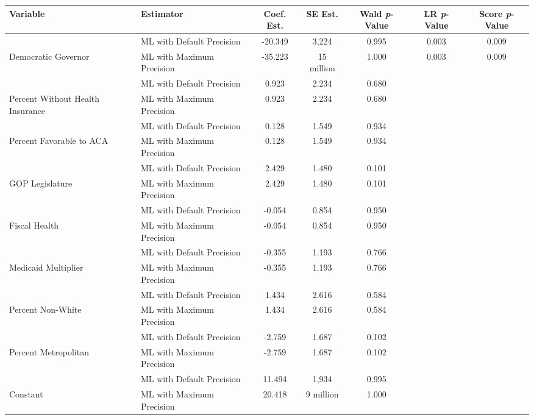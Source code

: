 
\begin{tabular}{llccccc}
\toprule
Variable & Estimator & Coef. Est. & SE Est. & Wald \textit{p}-Value & LR \textit{p}-Value & Score \textit{p}-Value\\
\midrule
 & ML with Default Precision & -20.349 & 3,224 & 0.995 & 0.003 & 0.009\\

\multirow{-2}{*}{\raggedright\arraybackslash Democratic Governor} & ML with Maximum Precision & -35.223 & 15 million & 1.000 & 0.003 & 0.009\\
\cmidrule{1-7}
 & ML with Default Precision & 0.923 & 2.234 & 0.680 &  & \\

\multirow{-2}{*}{\raggedright\arraybackslash Percent Without Health Insurance} & ML with Maximum Precision & 0.923 & 2.234 & 0.680 &  & \\
\cmidrule{1-7}
 & ML with Default Precision & 0.128 & 1.549 & 0.934 &  & \\

\multirow{-2}{*}{\raggedright\arraybackslash Percent Favorable to ACA} & ML with Maximum Precision & 0.128 & 1.549 & 0.934 &  & \\
\cmidrule{1-7}
 & ML with Default Precision & 2.429 & 1.480 & 0.101 &  & \\

\multirow{-2}{*}{\raggedright\arraybackslash GOP Legislature} & ML with Maximum Precision & 2.429 & 1.480 & 0.101 &  & \\
\cmidrule{1-7}
 & ML with Default Precision & -0.054 & 0.854 & 0.950 &  & \\

\multirow{-2}{*}{\raggedright\arraybackslash Fiscal Health} & ML with Maximum Precision & -0.054 & 0.854 & 0.950 &  & \\
\cmidrule{1-7}
 & ML with Default Precision & -0.355 & 1.193 & 0.766 &  & \\

\multirow{-2}{*}{\raggedright\arraybackslash Medicaid Multiplier} & ML with Maximum Precision & -0.355 & 1.193 & 0.766 &  & \\
\cmidrule{1-7}
 & ML with Default Precision & 1.434 & 2.616 & 0.584 &  & \\

\multirow{-2}{*}{\raggedright\arraybackslash Percent Non-White} & ML with Maximum Precision & 1.434 & 2.616 & 0.584 &  & \\
\cmidrule{1-7}
 & ML with Default Precision & -2.759 & 1.687 & 0.102 &  & \\

\multirow{-2}{*}{\raggedright\arraybackslash Percent Metropolitan} & ML with Maximum Precision & -2.759 & 1.687 & 0.102 &  & \\
\cmidrule{1-7}
 & ML with Default Precision & 11.494 & 1,934 & 0.995 &  & \\

\multirow{-2}{*}{\raggedright\arraybackslash Constant} & ML with Maximum Precision & 20.418 & 9 million & 1.000 &  & \\
\bottomrule
\end{tabular}